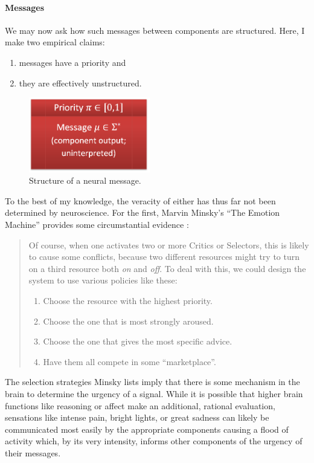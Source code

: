 \pagebreak

\paragraph{Messages}

We may now ask how such messages between components are structured. Here, I make two empirical claims:
\begin{enumerate}
	\item messages have a priority and
	\item they are effectively unstructured.
\end{enumerate}

\begin{figure}[!h]
	\centering
	\includegraphics[width=150pt]{figs/message.png}
	\caption{Structure of a neural message.}
	\label{fig:message}
\end{figure}

To the best of my knowledge, the veracity of either has thus far not been determined by neuroscience. For the first, Marvin Minsky's ``The Emotion Machine'' provides some circumstantial evidence \cite[p. 222]{emotionMachine}:

\begin{quote}
	Of course, when one activates two or more Critics or Selectors, this is likely to cause some conflicts, because two different resources might try to turn on a third resource both {\em on} and {\em off}. To deal with this, we could design the system to use various policies like these:
	
	\begin{enumerate}
		\item Choose the resource with the highest priority.
		\item Choose the one that is most strongly aroused.
		\item Choose the one that gives the most specific advice.
		\item Have them all compete in some ``marketplace''.
	\end{enumerate}
\end{quote}

The selection strategies Minsky lists imply that there is some mechanism in the brain to determine the urgency of a signal. While it is possible that higher brain functions like reasoning or affect make an additional, rational evaluation, sensations like intense pain, bright lights, or great sadness can likely be communicated most easily by the appropriate components causing a flood of activity which, by its very intensity, informs other components of the urgency of their messages.

